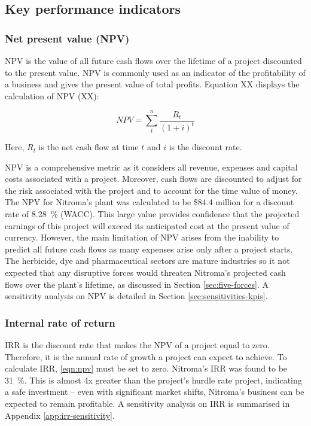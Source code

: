 \subsection{Key performance indicators}
\label{sec:KPIs}

\subsubsection{Net present value (NPV)}
NPV is the value of all future cash flows over the lifetime of a project discounted to the present value. NPV is commonly used as an indicator of the profitability of a business and gives the present value of total profits. Equation XX displays the calculation of NPV (XX):

\begin{equation}
\label{eqn:npv}
    NPV = \sum_t^n\frac{R_{t}}{(1+i)^{t}}
\end{equation}

Here, $R_{t}$ is the net cash flow at time $t$ and $i$ is the discount rate.

NPV is a comprehensive metric as it considers all revenue, expenses and capital costs associated with a project. Moreover, cash flows are discounted to adjust for the risk associated with the project and to account for the time value of money. The NPV for Nitroma’s plant was calculated to be \$84.4 million for a discount rate of \SI{8.28}{\percent} (WACC). This large value provides confidence that the projected earnings of this project will exceed its anticipated cost at the present value of currency. However, the main limitation of NPV arises from the inability to predict all future cash flows as many expenses arise only after a project starts. The herbicide, dye and pharmaceutical sectors are mature industries so it not expected that any disruptive forces would threaten Nitroma’s projected cash flows over the plant’s lifetime, as discussed in Section \ref{sec:five-forces}. A sensitivity analysis on NPV is detailed in Section \ref{sec:sensitivities-kpis}. 

\subsubsection{Internal rate of return}
IRR is the discount rate that makes the NPV of a project equal to zero. Therefore, it is the annual rate of growth a project can expect to achieve. To calculate IRR, \cref{eqn:npv} must be set to zero. Nitroma’s IRR was found to be \SI{31}{\percent}. This is almost 4x greater than the project’s hurdle rate project, indicating a safe investment – even with significant market shifts, Nitroma’s business can be expected to remain profitable. A sensitivity analysis on IRR is summarised in Appendix \ref{app:irr-sensitivity}.

